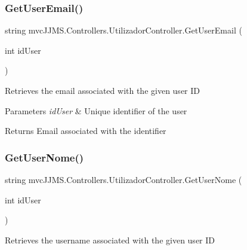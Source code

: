 \subsubsection{\texorpdfstring{Get\+User\+Email()}{GetUserEmail()}}
{\footnotesize\ttfamily string mvc\+J\+J\+M\+S.\+Controllers.\+Utilizador\+Controller.\+Get\+User\+Email (\begin{DoxyParamCaption}\item[{int}]{id\+User }\end{DoxyParamCaption})\hspace{0.3cm}{\ttfamily [inline]}}



Retrieves the email associated with the given user ID 


\begin{DoxyParams}{Parameters}
{\em id\+User} & Unique identifier of the user\\
\hline
\end{DoxyParams}
\begin{DoxyReturn}{Returns}
Email associated with the identifier
\end{DoxyReturn}
\mbox{\label{classmvc_j_j_m_s_1_1_controllers_1_1_utilizador_controller_a6250c090d89e8a6cea8347d9186daeb0}} 
\subsubsection{\texorpdfstring{Get\+User\+Nome()}{GetUserNome()}}
{\footnotesize\ttfamily string mvc\+J\+J\+M\+S.\+Controllers.\+Utilizador\+Controller.\+Get\+User\+Nome (\begin{DoxyParamCaption}\item[{int}]{id\+User }\end{DoxyParamCaption})\hspace{0.3cm}{\ttfamily [inline]}}



Retrieves the username associated with the given user ID 


